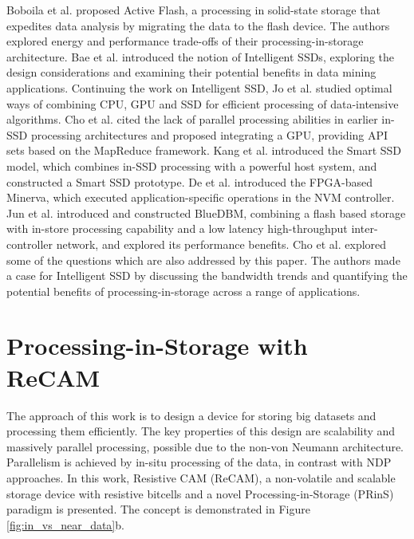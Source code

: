 \documentclass{superfri}
\begin{document}
Boboila et al. \cite{boboila2012active} proposed Active Flash, a processing in solid-state storage that expedites data analysis by migrating the data to the flash device. The authors explored energy and performance trade-offs of their processing-in-storage architecture. Bae et al. \cite{bae2013intelligent} introduced the notion of Intelligent SSDs, exploring the design considerations and examining their potential benefits in data mining applications. Continuing the work on Intelligent SSD, Jo et al. \cite{jo2016collaborative} studied optimal ways of combining CPU, GPU and SSD for efficient processing of data-intensive algorithms. Cho et al. \cite{cho2013xsd} cited the lack of parallel processing abilities in earlier in-SSD processing architectures and proposed integrating a GPU, providing API sets based on the MapReduce framework. Kang et al. \cite{kang2013enabling} introduced the Smart SSD model, which combines in-SSD processing with a powerful host system, and constructed a Smart SSD prototype. De et al. \cite{de2013minerva} introduced the FPGA-based Minerva, which executed application-specific operations in the NVM controller. Jun et al. \cite{jun2015bluedbm} introduced and constructed BlueDBM, combining a flash based storage with in-store processing capability and a low latency high-throughput inter-controller network, and explored its performance benefits. Cho et al. \cite{cho2013active} explored some of the questions which are also addressed by this paper. The authors made a case for Intelligent SSD by discussing the bandwidth trends and quantifying the potential benefits of processing-in-storage across a range of applications.


\section{Processing-in-Storage with ReCAM}
\label{sec:PRinS_with_ReCAM}

The approach of this work is to design a device for storing big datasets and processing them efficiently. The key properties of this design are scalability and massively parallel processing, possible due to the non-von Neumann architecture. Parallelism is achieved by in-situ processing of the data, in contrast with NDP approaches. In this work, Resistive CAM (ReCAM), a non-volatile and scalable storage device with resistive bitcells and a novel Processing-in-Storage (PRinS) paradigm is presented. The concept is demonstrated in Figure \ref{fig:in_vs_near_data}b.
\end{document}
